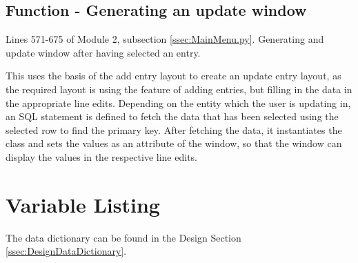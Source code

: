 \subsection{Function - Generating an update window}
Lines 571-675 of Module 2, subsection \ref{ssec:MainMenu.py}. Generating and update window after having selected an entry.
\begin{tiny}
\end{tiny}
This uses the basis of the add entry layout to create an update entry layout, as the required layout is using the feature of adding entries, but filling in the data in the appropriate line edits. Depending on the entity which the user is updating in, an SQL statement is defined to fetch the data that has been selected using the selected row to find the primary key. After fetching the data, it instantiates the class and sets the values as an attribute of the window, so that the window can display the values in the respective line edits.

\section{Variable Listing}

The data dictionary can be found in the Design Section \ref{ssec:DesignDataDictionary}.


